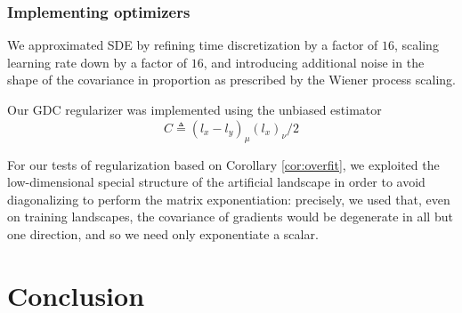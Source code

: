\documentclass[openany, notitlepage, justified]{tufte-book}
\theoremstyle{plain}
\theoremstyle{definition}
\begin{document}
        \subsection{Implementing optimizers}                            \label{appendix:optimizers}

            We approximated SDE by refining time discretization by a factor of
            $16$, scaling learning rate down by a factor of $16$, and introducing
            additional noise in the shape of the covariance in proportion as
            prescribed by the Wiener process scaling.

            Our GDC regularizer was implemented using the unbiased estimator
            $$
                \hat{C} \triangleq (l_x - l_y)_\mu (l_x)_\nu / 2
            $$
            
            For our tests of regularization based on Corollary \ref{cor:overfit},
            we exploited the low-dimensional special structure of the artificial
            landscape in order to avoid diagonalizing to perform the matrix
            exponentiation: precisely, we used that, even on training landscapes,
            the covariance of gradients would be degenerate in all but one
            direction, and so we need only exponentiate a scalar.



\chapter{Conclusion} \label{sect:concl}
\end{document}
